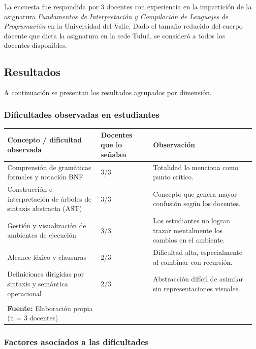 La encuesta fue respondida por 3 docentes con experiencia en la impartición de la asignatura \textit{Fundamentos de Interpretación y Compilación de Lenguajes de Programación} en la Universidad del Valle. Dado el tamaño reducido del cuerpo docente que dicta la asignatura en la sede Tuluá, se consideró a todos los docentes disponibles.

\subsection{Resultados}

A continuación se presentan los resultados agrupados por dimensión.

\subsubsection{Dificultades observadas en estudiantes}

\begin{longtable}{|p{7cm}|p{2.5cm}|p{5cm}|}
    \hline
    \textbf{Concepto / dificultad observada} & \textbf{Docentes que lo señalan} & \textbf{Observación} \\
    \hline
    \endhead
    Comprensión de gramáticas formales y notación BNF & 3/3 & Totalidad lo menciona como punto crítico. \\
    \hline
    Construcción e interpretación de árboles de sintaxis abstracta (AST) & 3/3 & Concepto que genera mayor confusión según los docentes. \\
    \hline
    Gestión y visualización de ambientes de ejecución & 3/3 & Los estudiantes no logran trazar mentalmente los cambios en el ambiente. \\
    \hline
    Alcance léxico y clausuras & 2/3 & Dificultad alta, especialmente al combinar con recursión. \\
    \hline
    Definiciones dirigidas por sintaxis y semántica operacional & 2/3 & Abstracción difícil de asimilar sin representaciones visuales. \\
    \hline
    \caption{Dificultades observadas por los docentes en los estudiantes de la asignatura FLP.\\
    \scriptsize \textbf{Fuente:} Elaboración propia (n = 3 docentes).}
    \label{tab:dificultad-docentes}
\end{longtable}

\subsubsection{Factores asociados a las dificultades}

